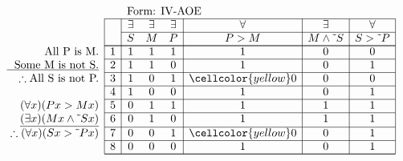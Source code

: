 \documentclass[10pt,legalpaper,landscape,cmtt]{article}
\begin{document}
{\begin{minipage}[t]{3.25in}
	\(
	\begin{array}{r|c|ccc|c|c|c|}
		\multicolumn{2}{c}{}&\multicolumn{6}{l}{\mbox{Form: IV-AOE}} \\ \cline{2-8}
		\hspace{1in}	&	& \exists & \exists & \exists & \forall & \exists & \forall\\ \cline{3-8}
		&	& S & M & P &  P > M  &  M \wedge \tilde~S  &  S > \tilde~P \\ \cline{2-8} \cline{2-8}
		\phantom{\therefore}\mbox{All P is M.}   & 1 & 1 & 1 & 1 &   1   &   0   &   0  \\ \cline{2-8}
		\underline{\phantom{\therefore}\mbox{Some M is not S.}}   & 2 & 1 & 1 & 0 &   1   &   0   &   1  \\ \cline{2-8}
		\therefore \mbox{All S is not P.}   & 3 & 1 & 0 & 1 &   \cellcolor{yellow} 0   &   0   &   0  \\ \cline{2-8}
		& 4 & 1 & 0 & 0 &   1   &   0   &   1  \\ \cline{2-8}
		(\forall x)(Px > Mx)   & 5 & 0 & 1 & 1 &   1   &   1   &   1  \\ \cline{2-8}
		\underline{(\exists x)(Mx \wedge \tilde~Sx)}   & 6 & 0 & 1 & 0 &   1   &   1   &   1  \\ \cline{2-8}
		\therefore(\forall x)(Sx > \tilde~Px)   & 7 & 0 & 0 & 1 &   \cellcolor{yellow} 0   &   0   &   1  \\ \cline{2-8}
		& 8 & 0 & 0 & 0 &   1   &   0   &   1   \\ \cline{2-8}\cline{2-8} 
	\end{array}
	\)
\end{minipage}

}
\end{document}
